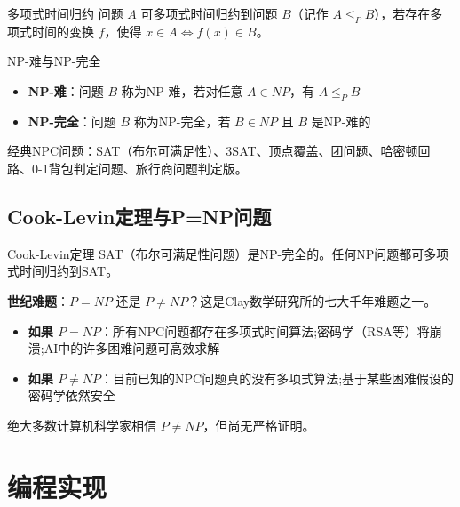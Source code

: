 \begin{mydefinition}{多项式时间归约}
问题 \(A\) 可多项式时间归约到问题 \(B\)（记作 \(A\leq_P B\)），若存在多项式时间的变换 \(f\)，使得 \(x\in A\iff f(x)\in B\)。
\end{mydefinition}

\begin{mydefinition}{NP-难与NP-完全}
\begin{itemize}
    \item \textbf{NP-难}：问题 \(B\) 称为NP-难，若对任意 \(A\in NP\)，有 \(A\leq_P B\)
    \item \textbf{NP-完全}：问题 \(B\) 称为NP-完全，若 \(B\in NP\) 且 \(B\) 是NP-难的
\end{itemize}
\end{mydefinition}

经典NPC问题：SAT（布尔可满足性）、3SAT、顶点覆盖、团问题、哈密顿回路、0-1背包判定问题、旅行商问题判定版。

\subsection{Cook-Levin定理与P=NP问题}

\begin{myTheorem}{Cook-Levin定理}
SAT（布尔可满足性问题）是NP-完全的。任何NP问题都可多项式时间归约到SAT。
\end{myTheorem}

\textbf{世纪难题}：\(P=NP\) 还是 \(P\neq NP\)？这是Clay数学研究所的七大千年难题之一。

\begin{itemize}
    \item \textbf{如果 \(P=NP\)}：所有NPC问题都存在多项式时间算法;密码学（RSA等）将崩溃;AI中的许多困难问题可高效求解
    \item \textbf{如果 \(P\neq NP\)}：目前已知的NPC问题真的没有多项式算法;基于某些困难假设的密码学依然安全
\end{itemize}

绝大多数计算机科学家相信 \(P\neq NP\)，但尚无严格证明。

\section{编程实现}

